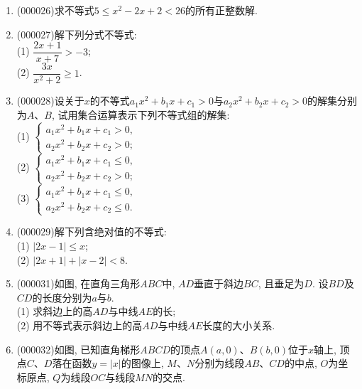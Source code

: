 \documentclass[10pt,a4paper]{article}
\begin{document}
\begin{enumerate}[1.]
\item {\tiny (000026)}求不等式$5\le x^2-2x+2<26$的所有正整数解.
\item {\tiny (000027)}解下列分式不等式:\\
(1) $\dfrac{2x+1}{x+7}>-3$;\\
(2) $\dfrac{3x}{x^2+2}\ge 1$.
\item {\tiny (000028)}设关于$x$的不等式$a_1x^2+b_1x+c_1>0$与$a_2x^2+b_2x+c_2>0$的解集分别为$A$、$B$,
试用集合运算表示下列不等式组的解集:\\
(1) $\begin{cases} a_1x^2+b_1x+c_1>0, \\ a_2x^2+b_2x+c_2>0;\end{cases}$\\
(2) $\begin{cases} a_1x^2+b_1x+c_1\le 0, \\ a_2x^2+b_2x+c_2>0;\end{cases}$\\
(3) $\begin{cases} a_1x^2+b_1x+c_1\le 0, \\ a_2x^2+b_2x+c_2\le 0.\end{cases}$
\item {\tiny (000029)}解下列含绝对值的不等式:\\
(1) $|2x-1|\le x$;\\
(2) $|2x+1|+|x-2|<8$.
\item {\tiny (000031)}如图, 在直角三角形$ABC$中, $AD$垂直于斜边$BC$, 且垂足为$D$. 设$BD$及$CD$的长度分别为$a$与$b$.\\
(1) 求斜边上的高$AD$与中线$AE$的长;\\
(2) 用不等式表示斜边上的高$AD$与中线$AE$长度的大小关系.
\begin{center}
\end{center}
\item {\tiny (000032)}如图, 已知直角梯形$ABCD$的顶点$A(a, 0)$、$B(b, 0)$位于$x$轴上, 顶点$C$、$D$落在函数$y=|x|$的图像上, $M$、$N$分别为线段$AB$、$CD$的中点, $O$为坐标原点, $Q$为线段$OC$与线段$MN$的交点.\\

\end{enumerate}
\end{document}
